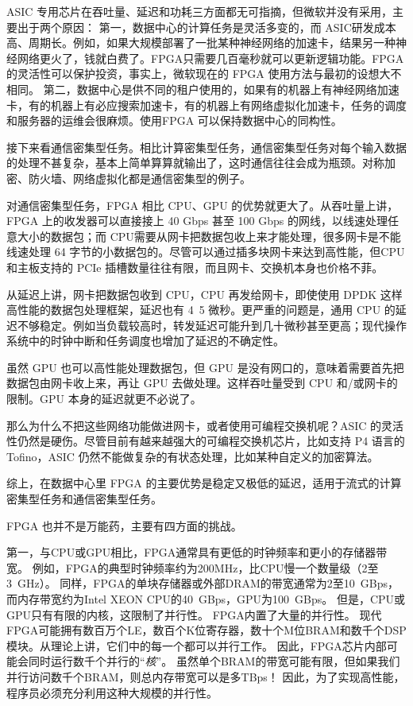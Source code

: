 ASIC 专用芯片在吞吐量、延迟和功耗三方面都无可指摘，但微软并没有采用，主要出于两个原因：
第一，数据中心的计算任务是灵活多变的，而 ASIC研发成本高、周期长。例如，如果大规模部署了一批某种神经网络的加速卡，结果另一种神经网络更火了，钱就白费了。FPGA只需要几百毫秒就可以更新逻辑功能。FPGA 的灵活性可以保护投资，事实上，微软现在的 FPGA 使用方法与最初的设想大不相同。
第二，数据中心是供不同的租户使用的，如果有的机器上有神经网络加速卡，有的机器上有必应搜索加速卡，有的机器上有网络虚拟化加速卡，任务的调度和服务器的运维会很麻烦。使用FPGA 可以保持数据中心的同构性。

接下来看通信密集型任务。相比计算密集型任务，通信密集型任务对每个输入数据的处理不甚复杂，基本上简单算算就输出了，这时通信往往会成为瓶颈。对称加密、防火墙、网络虚拟化都是通信密集型的例子。

对通信密集型任务，FPGA 相比 CPU、GPU 的优势就更大了。从吞吐量上讲，FPGA 上的收发器可以直接接上 40 Gbps 甚至 100 Gbps 的网线，以线速处理任意大小的数据包；而 CPU需要从网卡把数据包收上来才能处理，很多网卡是不能线速处理 64 字节的小数据包的。尽管可以通过插多块网卡来达到高性能，但CPU 和主板支持的 PCIe 插槽数量往往有限，而且网卡、交换机本身也价格不菲。

从延迟上讲，网卡把数据包收到 CPU，CPU 再发给网卡，即使使用 DPDK 这样高性能的数据包处理框架，延迟也有 4~5 微秒。更严重的问题是，通用 CPU 的延迟不够稳定。例如当负载较高时，转发延迟可能升到几十微秒甚至更高；现代操作系统中的时钟中断和任务调度也增加了延迟的不确定性。

虽然 GPU 也可以高性能处理数据包，但 GPU 是没有网口的，意味着需要首先把数据包由网卡收上来，再让 GPU 去做处理。这样吞吐量受到 CPU 和/或网卡的限制。GPU 本身的延迟就更不必说了。

那么为什么不把这些网络功能做进网卡，或者使用可编程交换机呢？ASIC 的灵活性仍然是硬伤。尽管目前有越来越强大的可编程交换机芯片，比如支持 P4 语言的 Tofino，ASIC 仍然不能做复杂的有状态处理，比如某种自定义的加密算法。

综上，在数据中心里 FPGA 的主要优势是稳定又极低的延迟，适用于流式的计算密集型任务和通信密集型任务。

FPGA 也并不是万能药，主要有四方面的挑战。

第一，与CPU或GPU相比，FPGA通常具有更低的时钟频率和更小的存储器带宽。
例如，FPGA的典型时钟频率约为200MHz，比CPU慢一个数量级（2至3~GHz）。
同样，FPGA的单块存储器或外部DRAM的带宽通常为2至10~GBps，而内存带宽约为Intel XEON CPU的40~GBps，GPU为100~GBps。
但是，CPU或GPU只有有限的内核，这限制了并行性。 FPGA内置了大量的并行性。
现代FPGA可能拥有数百万个LE，数百个K位寄存器，数十个M位BRAM和数千个DSP模块。从理论上讲，它们中的每一个都可以并行工作。
因此，FPGA芯片内部可能会同时运行数千个并行的``\textit {核}''。
虽然单个BRAM的带宽可能有限，但如果我们并行访问数千个BRAM，则总内存带宽可以是多TBps！
因此，为了实现高性能，程序员必须充分利用这种大规模的并行性。

